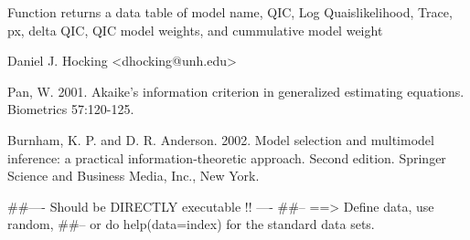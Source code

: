 \documentclass[a4paper]{book}
\begin{document}
%
\begin{Value}





Function returns a data table of model name, QIC, Log Quaislikelihood, Trace, px, delta QIC, QIC model weights, and cummulative model weight
\end{Value}
%
\begin{Author}\relax
Daniel J. Hocking <dhocking@unh.edu>
\end{Author}
%
\begin{References}\relax
Pan, W. 2001. Akaike's information criterion in generalized estimating equations. Biometrics 57:120-125.

Burnham, K. P. and D. R. Anderson. 2002. Model selection and multimodel inference: a practical information-theoretic approach. Second edition. Springer Science and Business Media, Inc., New York.

\end{References}
%
\begin{Examples}
\begin{ExampleCode}
##---- Should be DIRECTLY executable !! ----
##-- ==>  Define data, use random,
##--	or do  help(data=index)  for the standard data sets.


\end{ExampleCode}
\end{Examples}
\printindex{}
\end{document}
